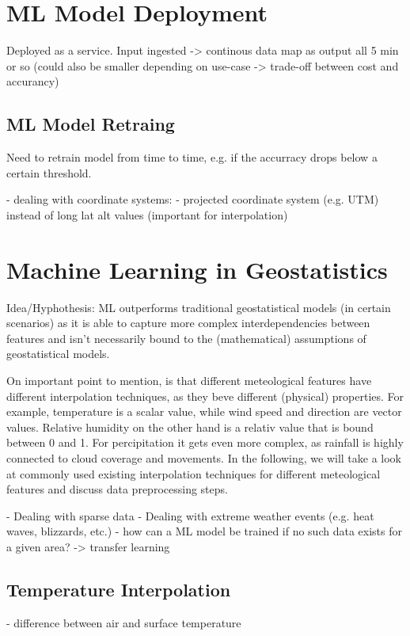 \section{ML Model Deployment}
Deployed as a service. Input ingested -> continous data map as output all 5 min or so (could also be smaller depending on use-case -> trade-off between cost and accurancy)

\subsection{ML Model Retraing}
Need to retrain model from time to time, e.g. if the accurracy drops below a certain threshold.


- dealing with coordinate systems:
    - projected coordinate system (e.g. UTM) instead of long lat alt values (important for interpolation)

\section{Machine Learning in Geostatistics}

Idea/Hyphothesis: ML outperforms traditional geostatistical models (in certain scenarios) as it is able to capture more complex interdependencies between features and isn't necessarily bound to the (mathematical) assumptions of geostatistical models.

On important point to mention, is that different meteological features have different interpolation techniques, as they beve different (physical) properties. For example, temperature is a scalar value, while wind speed and direction are vector values. Relative humidity on the other hand is a relativ value that is bound between 0 and 1. For percipitation it gets even more complex, as rainfall is highly connected to cloud coverage and movements. In the following, we will take a look at commonly used existing interpolation techniques for different meteological features and discuss data preprocessing steps.

- Dealing with sparse data
- Dealing with extreme weather events (e.g. heat waves, blizzards, etc.)
- how can a ML model be trained if no such data exists for a given area? -> transfer learning

\subsection{Temperature Interpolation}
- difference between air and surface temperature

